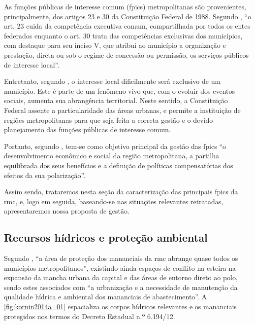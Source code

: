 	As funções públicas de interesse comum (\gls{fpic}s) metropolitanas são provenientes, principalmente, dos artigos 23 e 30 da Constituição Federal de 1988. Segundo , ``o art. 23 cuida da competência executiva comum, compartilhada por todos os entes federados enquanto o art. 30 trata das competências exclusivas dos municípios, com destaque para seu inciso V, que atribui ao município a organização e prestação, direta ou sob o regime de concessão ou permissão, os serviços públicos de interesse local''.
	
	Entretanto, segundo \cite{barroso2007a}, o interesse local dificilmente será exclusivo de um município. Este é parte de um fenômeno vivo que, com o evoluir dos eventos sociais, aumenta sua abrangência territorial. Neste sentido, a Constituição Federal assente a particularidade das áreas urbanas, e permite a instituição de regiões metropolitanas para que seja feita a correta gestão e o devido planejamento das funções públicas de interesse comum.
	
	Portanto, segundo , tem-se como objetivo principal da gestão das \gls{fpic}s ``o desenvolvimento econômico e social da região metropolitana, a partilha equilibrada dos seus benefícios e a definição de políticas compensatórias dos efeitos da sua polarização''.
	
	Assim sendo, trataremos nesta seção da caracterização das principais \gls{fpic}s da \glsdesc{rmc}, e, logo em seguida, baseando-se nas situações relevantes retratadas, apresentaremos nossa proposta de gestão.
	
	\subsection{Recursos hídricos e proteção ambiental}
	
	Segundo , ``a área de proteção dos mananciais da \gls{rmc} abrange quase todos os municípios metropolitanos'', existindo ainda espaços de conflito na esteira na expansão da mancha urbana da capital e das áreas de entorno direto ao polo, sendo estes associados com ``a urbanização e a necessidade de manutenção da qualidade hídrica e ambiental dos mananciais de abastecimento''. A \autoref{fig:kornin2014a_01} espacializa os corpos hídricos relevantes e os mananciais protegidos nos termos do Decreto Estadual n.º 6.194/12.
	
